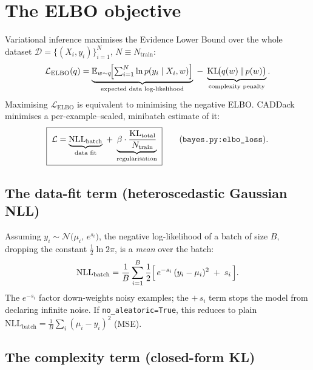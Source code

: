\documentclass[11pt,a4paper]{article}
\newcommand{\N}{\mathcal{N}}
\newcommand{\code}[1]{\texttt{#1}}
\newcommand{\KL}{\mathrm{KL}}
\newcommand{\NLL}{\mathrm{NLL}}
\begin{document}
\section{The ELBO objective}
\label{sec:elbo}

Variational inference maximises the Evidence Lower Bound over the whole dataset
$\mathcal{D} = \{(X_i, y_i)\}_{i=1}^{N}$, $N \equiv N_{\text{train}}$:
\begin{equation}
\mathcal{L}_{\text{ELBO}}(q)
= \underbrace{\mathbb{E}_{w\sim q}\!\Bigl[\textstyle\sum_{i=1}^{N}\ln p(y_i\mid X_i, w)\Bigr]}_{\text{expected data log-likelihood}}
\;-\; \underbrace{\KL\!\bigl(q(w)\,\|\,p(w)\bigr)}_{\text{complexity penalty}} .
\end{equation}
Maximising $\mathcal{L}_{\text{ELBO}}$ is equivalent to minimising the negative ELBO.
CADDack minimises a per-example--scaled, minibatch estimate of it:
\begin{equation}
\boxed{\;
\mathcal{L}
= \underbrace{\NLL_{\text{batch}}}_{\text{data fit}}
\;+\; \underbrace{\beta \cdot \dfrac{\KL_{\text{total}}}{N_{\text{train}}}}_{\text{regularisation}}
\;}
\qquad \text{(\code{bayes.py:elbo\_loss})}.
\label{eq:loss}
\end{equation}

\subsection{The data-fit term (heteroscedastic Gaussian NLL)}

Assuming $y_i \sim \N\!\bigl(\mu_i,\, e^{s_i}\bigr)$, the negative log-likelihood of a
batch of size $B$, dropping the constant $\tfrac12\ln 2\pi$, is a \emph{mean} over the
batch:
\begin{equation}
\NLL_{\text{batch}}
= \frac{1}{B}\sum_{i=1}^{B}
  \frac{1}{2}\Bigl[\, e^{-s_i}\,(y_i - \mu_i)^2 \;+\; s_i \,\Bigr].
\label{eq:nll}
\end{equation}
The $e^{-s_i}$ factor down-weights noisy examples; the $+\,s_i$ term stops the model
from declaring infinite noise. If \code{no\_aleatoric=True}, this reduces to plain
$\NLL_{\text{batch}} = \frac{1}{B}\sum_i (\mu_i - y_i)^2$ (MSE).

\subsection{The complexity term (closed-form KL)}
\end{document}
